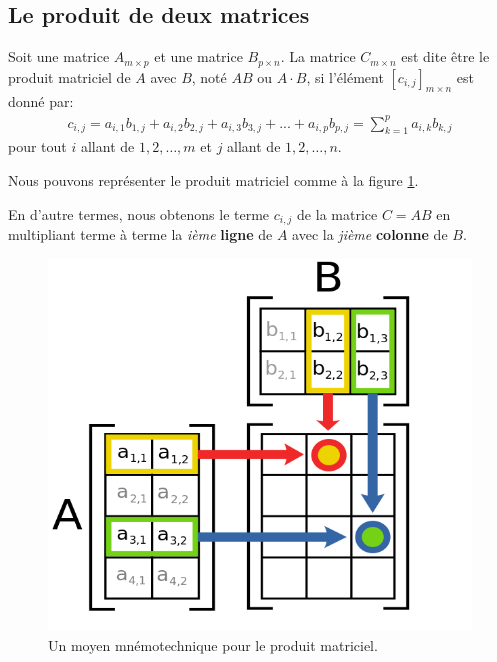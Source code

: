 \documentclass[]{book}
\theoremstyle{definition}
\theoremstyle{definition}
\theoremstyle{definition}
\theoremstyle{remark}
\let\BeginKnitrBlock\begin \let\EndKnitrBlock\end
\begin{document}
\hypertarget{le-produit-de-deux-matrices}{%
\subsection{Le produit de deux matrices}\label{le-produit-de-deux-matrices}}

\BeginKnitrBlock{definition}
\protect\hypertarget{def:unnamed-chunk-61}{}{\label{def:unnamed-chunk-61} }Soit une matrice \(A_{m\times p}\) et une matrice \(B_{p\times n}\). La matrice \(C_{m\times n}\) est dite être le produit matriciel de \(A\) avec \(B\), noté \(AB\) ou \(A\cdot B\), si l'élément \([c_{i,j}]_{m\times n}\) est donné par:
\begin{align*}
c_{i,j}=a_{i,1}b_{1,j}+a_{i,2}b_{2,j}+a_{i,3}b_{3,j}+...+a_{i,p}b_{p,j}=\sum_{k=1}^pa_{i,k}b_{k,j}
\end{align*}
pour tout \(i\) allant de \(1,2, \ldots , m\) et \(j\) allant de \(1,2,\ldots , n\).

Nous pouvons représenter le produit matriciel comme à la figure \ref{fig:matrix-multiplication}.

En d'autre termes, nous obtenons le terme \(c_{i,j}\) de la matrice \(C=AB\) en multipliant terme à terme la \emph{ième} \textbf{ligne} de \(A\) avec la \emph{jième} \textbf{colonne} de \(B\).
\EndKnitrBlock{definition}

\begin{figure}

{\centering \includegraphics{resources/images/Depection-of-Matrix-Multiplication} 

}

\caption{Un moyen mnémotechnique pour le produit matriciel.}\label{fig:matrix-multiplication}
\end{figure}
\end{document}
